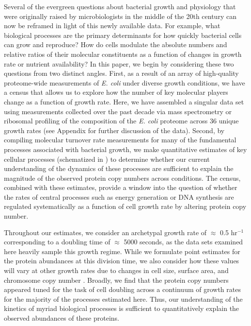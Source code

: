 Several of the evergreen questions about bacterial growth and physiology that
were originally raised by microbiologists in the middle of the 20th century
can now be reframed in light of this newly available data. For example, what
biological processes are the primary determinants for how quickly bacterial
cells can grow and reproduce? How do cells modulate the absolute numbers and
relative ratios of their molecular constituents as a function of changes in
growth rate or nutrient availability? In this paper, we begin by considering these two
questions from two distinct angles. First, as a result of an array of
high-quality proteome-wide measurements of \textit{E. coli} under diverse
growth conditions, we have a census that allows us to explore how the number
of key molecular players change as a function of growth rate. Here, we have
assembled a singular data set using measurements collected over the past
decade via mass spectrometry \citep{schmidt2016, peebo2015, valgepea2013} or
ribosomal profiling \citep{li2014} of the composition of the \textit{E. coli}
proteome across 36 unique growth rates (see Appendix
 for further discussion of the data). Second, by
compiling molecular turnover rate measurements for many of the fundamental
processes associated with bacterial growth, we make quantitative estimates of
key cellular processes (schematized in ) to determine whether
our current understanding of the dynamics of these processes are sufficient
to explain the magnitude of the observed protein copy numbers across
conditions. The census, combined with these estimates, provide a window into
the question of whether the rates of central processes such as energy
generation or DNA synthesis are regulated systematically as a function of
cell growth rate by altering protein copy number.

Throughout our estimates, we consider an archetypal growth rate of $\approx$ 0.5
hr$^{-1}$ corresponding to a doubling time of $\approx$ 5000 seconds, as the
data sets examined here heavily sample this growth regime. While we formulate point estimates for the
protein abundances at this division time, we also consider how these values will
vary at other growth rates due to changes in cell size, surface area, and
chromosome copy number \citep{taheriaraghi2015}. Broadly, we find that the
protein copy numbers appeared tuned for the task of cell doubling across a
continuum of growth rates for the majority of the processes estimated here.
Thus, our understanding of the kinetics of myriad biological processes is
sufficient to quantitatively explain the observed abundances of these proteins.


